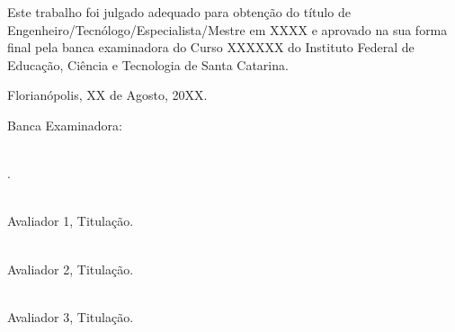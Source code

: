 {
  \begin{center}
    \textbf{\fontsize{14pt}{16pt}\selectfont \MakeUppercase{\imprimirtitulo}}%
    \vspace{\onelineskip}%
    \textbf{\center\fontsize{12pt}{14pt}\selectfont \MakeUppercase{\imprimirautor}}%
  \end{center}%
  \vspace{\onelineskip}%
  {\justifying\noindent Este trabalho foi julgado adequado para obtenção do título de
    Engenheiro/Tecnólogo/Especialista/Mestre em XXXX e aprovado na sua forma final
    pela banca examinadora do Curso XXXXXX do Instituto Federal de Educação,
    Ciência e Tecnologia de Santa Catarina.}%

  \vfill%

  {\fontsize{12pt}{14pt}\selectfont
  \begin{center}%
    Florianópolis, XX de Agosto, 20XX.%
  \end{center}%
  \vspace{\onelineskip}
  \begin{flushleft}%
    Banca Examinadora:%
  \end{flushleft}%

  \begin{center}
    \vspace{3\onelineskip}
    \underline{\hspace{10cm}}\\
    \imprimirorientador.

    \vspace{3\onelineskip}
    \vfill
   \underline{\hspace{10cm}}\\
   Avaliador 1, Titulação.

   \vspace{3\onelineskip}
   \vfill
   \underline{\hspace{10cm}}\\
   Avaliador 2, Titulação.

   \vspace{3\onelineskip}
   \vfill
   \underline{\hspace{10cm}}\\
   Avaliador 3, Titulação.

 \end{center}
 \vfill
 }
}